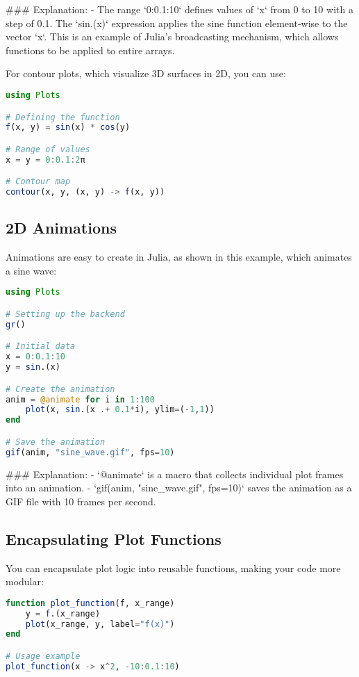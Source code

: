 \documentclass[a4paper,12pt]{article}
\begin{document}
### Explanation:
- The range `0:0.1:10` defines values of `x` from 0 to 10 with a step of 0.1. The `sin.(x)` expression applies the sine function element-wise to the vector `x`. This is an example of Julia's broadcasting mechanism, which allows functions to be applied to entire arrays.

For contour plots, which visualize 3D surfaces in 2D, you can use:

\begin{lstlisting}[language=Julia]
using Plots

# Defining the function
f(x, y) = sin(x) * cos(y)

# Range of values
x = y = 0:0.1:2π

# Contour map
contour(x, y, (x, y) -> f(x, y))
\end{lstlisting}

\subsection{2D Animations}
Animations are easy to create in Julia, as shown in this example, which animates a sine wave:

\begin{lstlisting}[language=Julia]
using Plots

# Setting up the backend
gr()

# Initial data
x = 0:0.1:10
y = sin.(x)

# Create the animation
anim = @animate for i in 1:100
    plot(x, sin.(x .+ 0.1*i), ylim=(-1,1))
end

# Save the animation
gif(anim, "sine_wave.gif", fps=10)
\end{lstlisting}

### Explanation:
- `@animate` is a macro that collects individual plot frames into an animation.
- `gif(anim, "sine_wave.gif", fps=10)` saves the animation as a GIF file with 10 frames per second.

\subsection{Encapsulating Plot Functions}
You can encapsulate plot logic into reusable functions, making your code more modular:

\begin{lstlisting}[language=Julia]
function plot_function(f, x_range)
    y = f.(x_range)
    plot(x_range, y, label="f(x)")
end

# Usage example
plot_function(x -> x^2, -10:0.1:10)
\end{lstlisting}
\end{document}
